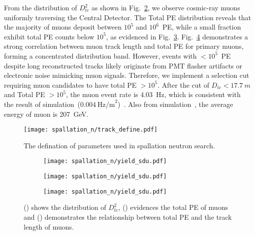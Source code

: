 From the distribution of $D_{tc}^2$ as shown in Fig.~\ref{fig:dfcc}, we observe cosmic-ray muons uniformly traversing the Central Detector. The Total PE distribution reveals that the majority of muons deposit between $10^5$ and $10^6$~\si{PE}, while a small fraction exhibit total PE counts below $10^5$, as evidenced in Fig.~\ref{fig:pe}. Fig.~\ref{fig:track-pe} demonstrates a strong correlation between muon track length and total PE for primary muons, forming a concentrated distribution band. However, events with $<10^5$~PE despite long reconstructed tracks likely originate from PMT flasher artifacts or electronic noise mimicking muon signals. Therefore, we implement a selection cut requiring muon candidates to have total PE $>10^5$. After the cut of $D_{tc}<\SI{17.7}{m}$ and Total PE $>10^5$, the muon event rate is \SI{4.03}{Hz}, which is consistent with the result of simulation~($0.004~\text{Hz/m}^2$)~\cite{muon207}. Also from simulation~\cite{muon207}, the average energy of muon is \SI{207}{GeV}.
\begin{figure}
	\centering
	\texttt{[image: spallation\_n/track\_define.pdf]}
	\caption{The defination of parameters used in spallation neutron search.}
	\label{fig:muonTrackDef}
\end{figure}


\begin{figure}[htbp]
	\centering
	\begin{subfigure}{0.5\textwidth}
		\centering
		\texttt{[image: spallation\_n/yield\_sdu.pdf]}
		\caption{}
		\label{fig:dfcc}
	\end{subfigure}%
	\begin{subfigure}{0.5\textwidth}
		\centering
		\texttt{[image: spallation\_n/yield\_sdu.pdf]}
		\caption{}
		\label{fig:pe}
	\end{subfigure}
	\begin{subfigure}{0.5\textwidth}
		\centering
		\texttt{[image: spallation\_n/yield\_sdu.pdf]}
		\caption{}
		\label{fig:track-pe}
	\end{subfigure}
	\caption{() shows the distribution of $D_{tc}^2$, () evidences the total PE of muons and () demonstrates the relationship between total PE and the track length of muons.}
	\label{fig:MuonInfo}
\end{figure}

